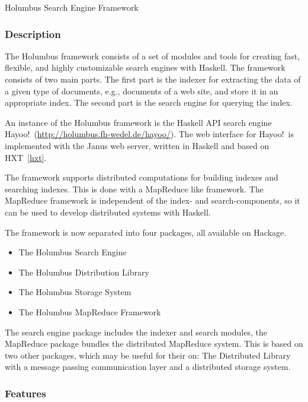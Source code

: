\begin{hcarentry}[updated]{Holumbus Search Engine Framework}
\label{holumbus}
\makeheader

\subsubsection*{Description}

The Holumbus framework consists of a set of modules and tools
for creating fast, flexible, and highly customizable search engines with Haskell.
The framework consists of two main parts. The first part is the indexer for extracting the data
of a given type of documents, e.g., documents of a web site, and store it in an appropriate index.
The second part is the search engine for querying the index.

An instance of the Holumbus framework is the Haskell API search engine Hayoo!\
(\url{http://holumbus.fh-wedel.de/hayoo/}). The web interface for Hayoo!\ is
implemented with the Janus web server, written in Haskell and based on HXT~\cref{hxt}.

The framework supports distributed computations for building indexes
and searching indexes. This is done with a MapReduce like framework.
The MapReduce framework is independent of the index- and
search-components, so it can be used to develop distributed systems
with Haskell.

The framework is now separated into four packages, all available on
Hackage.

\begin{itemize}
\item The Holumbus Search Engine 
\item The Holumbus Distribution Library
\item The Holumbus Storage System
\item The Holumbus MapReduce Framework
\end{itemize}

The search engine package includes the indexer and search modules,
the MapReduce package bundles the distributed MapReduce system.
This is based on two other packages, which may be useful for their on:
The Distributed Library with a message passing communication layer
and a distributed storage system.

\subsubsection*{Features}


\end{hcarentry}
